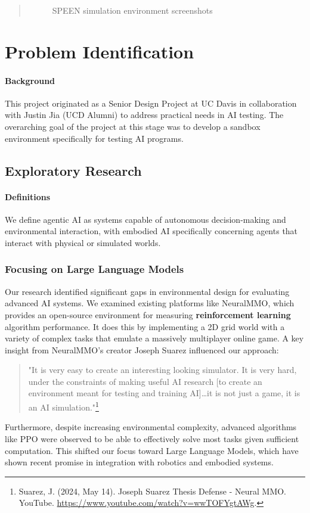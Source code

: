 \documentclass{article}
\begin{document}
\begin{abstract}
\begin{figure}[ht!]
\begin{minipage}[b]{0.47\textwidth}
        \end{minipage}
        \caption{SPEEN simulation environment screenshots}
        \label{fig:speen-environment}
    \end{figure}
\end{abstract}

\section{Problem Identification}

\paragraph{Background}
This project originated as a Senior Design Project at UC Davis in collaboration with Justin Jia (UCD Alumni) to address practical needs in AI testing.
The overarching goal of the project at this stage was to develop a sandbox environment specifically for testing AI programs.

\subsection{Exploratory Research}

\paragraph{Definitions}
We define agentic AI as systems capable of autonomous decision-making and environmental interaction, with embodied AI specifically concerning agents that interact with physical or simulated worlds.

\subsubsection{Focusing on Large Language Models}
Our research identified significant gaps in environmental design for evaluating advanced AI systems.
We examined existing platforms like NeuralMMO, which provides an open-source environment for measuring \textbf{reinforcement learning} algorithm performance.
It does this by implementing a 2D grid world with a variety of complex tasks that emulate a massively multiplayer online game.
A key insight from NeuralMMO's creator Joseph Suarez influenced our approach:
\begin{quote}
    "It is very easy to create an interesting looking simulator. It is very hard, under the constraints of making useful AI research [to create an environment meant for testing and training AI]…it is not just a game, it is an AI simulation."\footnote{Suarez, J. (2024, May 14). Joseph Suarez Thesis Defense - Neural MMO. YouTube. \url{https://www.youtube.com/watch?v=wwTOFYgtAWg}.}
\end{quote}
Furthermore, despite increasing environmental complexity, advanced algorithms like PPO were observed to be able to effectively solve most tasks given sufficient computation.
This shifted our focus toward Large Language Models, which have shown recent promise in integration with robotics and embodied systems.
\end{document}
